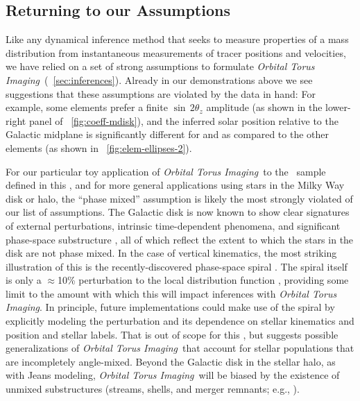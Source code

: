 \documentclass[modern]{aastex63}
\newcommand{\methodname}{\textsl{Orbital Torus Imaging}}
\newcommand{\apogee}{\acronym{APOGEE}}
\begin{document}
\subsection{Returning to our Assumptions}

Like any dynamical inference method that seeks to measure properties of a mass
distribution from instantaneous measurements of tracer positions and velocities,
we have relied on a set of strong assumptions to formulate \methodname\
(\sectionname~\ref{sec:inferences}).
Already in our demonstrations above we see suggestions that these assumptions
are violated by the data in hand: For example, some elements prefer a finite
$\sin\,2\theta_z$ amplitude (as shown in the lower-right panel of
\figurename~\ref{fig:coeff-mdisk}), and the inferred solar position relative to
the Galactic midplane is significantly different for \abunratio{Mg}{Fe} and
\abunratio{Si}{Fe} as compared to the other elements (as shown in
\figurename~\ref{fig:elem-ellipses-2}).

For our particular toy application of \methodname\ to the \apogee\ sample
defined in this \documentname, and for more general applications using stars in
the Milky Way disk or halo, the ``phase mixed'' assumption is likely the most
strongly violated of our list of assumptions.
The Galactic disk is now known to show clear signatures of external
perturbations, intrinsic time-dependent phenomena, and significant phase-space
substructure \citep[e.g.,][]{Antoja:2018, Schonrich:2018, Hunt:2018,
Kamdar:2019, Monari:2019, Khanna:2019, Poggio:2020, Laporte:2020,
Coronado:2020}, all of which reflect the extent to which the stars in the disk
are not phase mixed.
In the case of vertical kinematics, the most striking illustration of this is
the recently-discovered phase-space spiral \citep{Antoja:2018}.
The spiral itself is only a $\approx$10\% perturbation to the local distribution
function \citep{Laporte:2019}, providing some limit to the amount with which
this will impact inferences with \methodname.
In principle, future implementations could make use of the spiral by explicitly
modeling the perturbation and its dependence on stellar kinematics and position
and stellar labels.
That is out of scope for this \documentname, but suggests possible
generalizations of \methodname\ that account for stellar populations that are
incompletely angle-mixed.
Beyond the Galactic disk in the stellar halo, as with Jeans modeling,
\methodname\ will be biased by the existence of unmixed substructures (streams,
shells, and merger remnants; e.g., \citealt{Grillmair:2016, Shipp:2018}).
\end{document}
